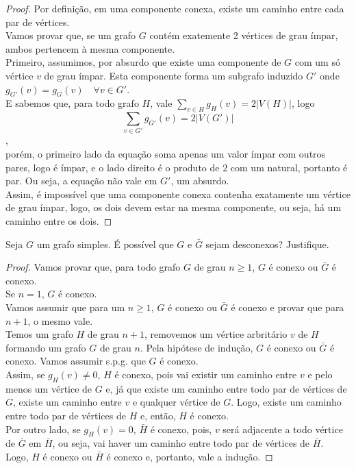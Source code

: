 \documentclass[12pt]{article}
\newenvironment{problem}[2][Ex]{\begin{trivlist}
\item[\hskip \labelsep {\bfseries #1}\hskip \labelsep {\bfseries #2.}]}{\end{trivlist}}
\begin{document}
\begin{proof}
Por definição, em uma componente conexa, existe um caminho entre cada par de vértices. \\
Vamos provar que, se um grafo $G$ contém exatemente 2 vértices de grau ímpar, ambos pertencem à mesma componente. \\
Primeiro, assumimos, por absurdo que existe uma componente de $G$ com um só vértice $v$ de grau ímpar. Esta componente forma um subgrafo induzido $G'$ onde $g_{G'}(v) = g_G(v) \quad \forall v \in G'$. \\
E sabemos que, para todo grafo $H$, vale $\sum_{v \in H} g_H(v) = 2|V(H)|$, logo
$$ \sum_{v \in G'} g_{G'}(v) = 2|V(G')| $$, \\
porém, o primeiro lado da equação soma apenas um valor ímpar com outros pares, logo é ímpar, e o lado direito é o produto de 2 com um natural, portanto é par. Ou seja, a equação não vale em $G'$, um absurdo. \\
Assim, é impossível que uma componente conexa contenha exatamente um vértice de grau ímpar, logo, os dois devem estar na mesma componente, ou seja, há um caminho entre os dois.
\end{proof}

\begin{problem}{E5}
Seja $G$ um grafo simples. É possível que $G$ e $\bar{G}$ sejam desconexos? Justifique.
\end{problem}

\begin{proof}
Vamos provar que, para todo grafo $G$ de grau $n \geq 1$, $G$ é conexo ou $\bar{G}$ é conexo. \\
Se $n = 1$, $G$ é conexo. \\
Vamos assumir que para um $n \geq 1$, $G$ é conexo ou $\bar{G}$ é conexo e provar que para $n+1$, o mesmo vale. \\
Temos um grafo $H$ de grau $n+1$, removemos um vértice arbritário $v$ de $H$ formando um grafo $G$ de grau $n$. Pela hipótese de indução, $G$ é conexo ou $\bar{G}$ é conexo. Vamos assumir s.p.g. que $G$ é conexo. \\
Assim, se $g_H(v) \neq 0$, $H$ é conexo, pois vai existir um caminho entre $v$ e pelo menos um vértice de $G$ e, já que existe um caminho entre todo par de vértices de $G$, existe um caminho entre $v$ e qualquer vértice de $G$. Logo, existe um caminho entre todo par de vértices de $H$ e, então, $H$ é conexo. \\
Por outro lado, se $g_H(v) = 0$, $\bar{H}$ é conexo, pois, $v$ será adjacente a todo vértice de $\bar{G}$ em $\bar{H}$, ou seja, vai haver um caminho entre todo par de vértices de $\bar{H}$. \\
Logo, $H$ é conexo ou $\bar{H}$ é conexo e, portanto, vale a indução.
\end{proof}
\end{document}
